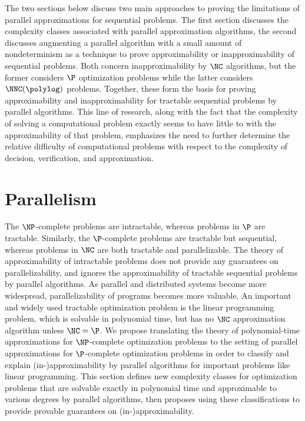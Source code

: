 \documentclass{article}
\begin{document}
%
The two sections below discuss two main approaches to proving the limitations of parallel approximations for sequential problems.
The first section discusses the complexity classes associated with parallel approximation algorithms, the second discusses augmenting a parallel algorithm with a small amount of nondeterminism as a technique to prove approximability or inapproximability of sequential problems.
Both concern inapproximability by $\NC$ algorithms, but the former considers $\P$ optimization problems while the latter considers $\NNC(\polylog)$ problems.
Together, these form the basis for proving approximability and inapproximability for tractable sequential problems by parallel algorithms.
This line of research, along with the fact that the complexity of solving a computational problem exactly seems to have little to with the approximability of that problem, emphasizes the need to further determine the relative difficulty of computational problems with respect to the complexity of decision, verification, and approximation.

\section{Parallelism}
\label{sec:par}
%
%
%
The $\NP$-complete problems are intractable, whereas problems in $\P$ are tractable.
Similarly, the $\P$-complete problems are tractable but sequential, whereas problems in $\NC$ are both tractable and parallelizable.
%
%
The theory of approximability of intractable problems does not provide any guarantees on parallelizability, and ignores the approximability of tractable sequential problems by parallel algorithms.
As parallel and distributed systems become more widespread, parallelizability of programs becomes more valuable.
An important and widely used tractable optimization problem is the linear programming problem, which is solvable in polynomial time, but has no $\NC$ approximation algorithm unless $\NC = \P$.
%
%
We propose translating the theory of polynomial-time approximations for $\NP$-complete optimization problems to the setting of parallel approximations for $\P$-complete optimization problems in order to classify and explain (in-)approximability by parallel algorithms for important problems like linear programming.
%
%
This section defines new complexity classes for optimization problems that are solvable exactly in polynomial time and approximable to various degrees by parallel algorithms, then proposes using these classifications to provide provable guarantees on (in-)approximability.
\end{document}
